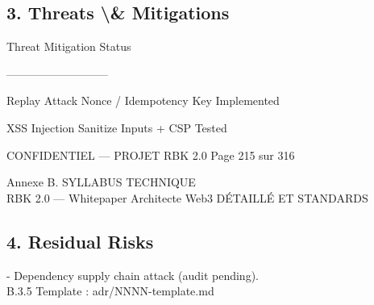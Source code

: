 \subsection*{3. Threats \textbackslash{}& Mitigations}
\begin{center}\begin{tabular}\textbar{} Threat \textbar{} Mitigation \textbar{} Status \textbar{}\end{tabular}\end{center}
\begin{center}\begin{tabular}\textbar{}--------\textbar{}------------\textbar{}--------\textbar{}\end{tabular}\end{center}
\begin{center}\begin{tabular}\textbar{} Replay Attack \textbar{} Nonce / Idempotency Key \textbar{} Implemented \textbar{}\end{tabular}\end{center}
\begin{center}\begin{tabular}\textbar{} XSS Injection \textbar{} Sanitize Inputs + CSP     \textbar{} Tested \textbar{}\end{tabular}\end{center}
\vspace{0.5em}
\vspace{0.5em}
\vspace{0.5em}
\vspace{0.5em}
\begin{confidential}CONFIDENTIEL — PROJET RBK 2.0                      Page 215 sur 316\end{confidential}
Annexe B. SYLLABUS TECHNIQUE\\
RBK 2.0 — Whitepaper Architecte Web3                                                  DÉTAILLÉ ET STANDARDS\\
\vspace{0.5em}
\vspace{0.5em}
\subsection*{4. Residual Risks}
- Dependency supply chain attack (audit pending).\\
\vspace{0.5em}
\vspace{0.5em}
B.3.5 Template : adr/NNNN-template.md\\
